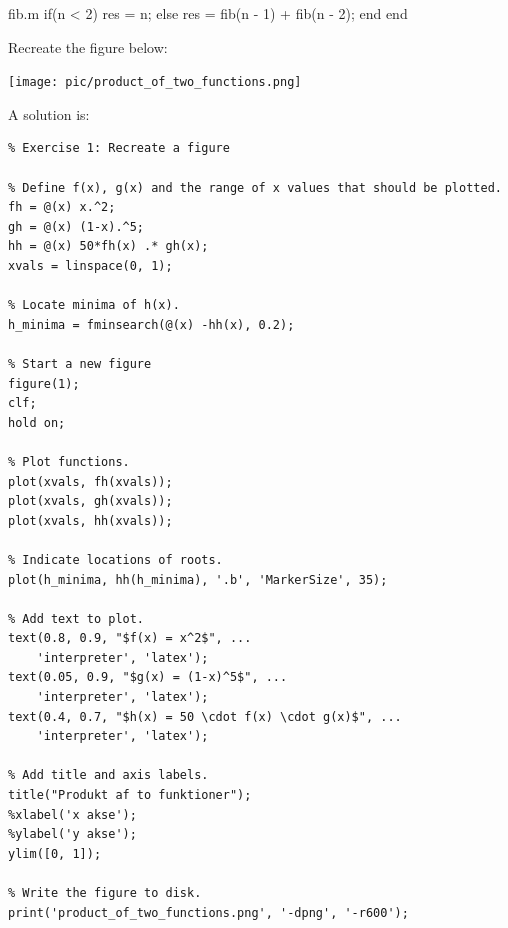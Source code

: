 \begin{ex}
\begin{solutionfile}{fib.m}
if(n < 2)
  res = n;
else
  res = fib(n - 1) + fib(n - 2);
end
end
\end{solutionfile}
\end{ex}





\begin{ex}
Recreate the figure below:
\begin{center}
\texttt{[image: pic/product\_of\_two\_functions.png]}
\end{center}
\begin{hint}
\end{hint}
\begin{sol}
A solution is:
\begin{lstlisting}
% Exercise 1: Recreate a figure

% Define f(x), g(x) and the range of x values that should be plotted.
fh = @(x) x.^2;
gh = @(x) (1-x).^5;
hh = @(x) 50*fh(x) .* gh(x);
xvals = linspace(0, 1);

% Locate minima of h(x).
h_minima = fminsearch(@(x) -hh(x), 0.2);

% Start a new figure
figure(1);
clf;
hold on;

% Plot functions.
plot(xvals, fh(xvals));
plot(xvals, gh(xvals));
plot(xvals, hh(xvals));

% Indicate locations of roots.
plot(h_minima, hh(h_minima), '.b', 'MarkerSize', 35);

% Add text to plot.
text(0.8, 0.9, "$f(x) = x^2$", ...
    'interpreter', 'latex');
text(0.05, 0.9, "$g(x) = (1-x)^5$", ...
    'interpreter', 'latex');
text(0.4, 0.7, "$h(x) = 50 \cdot f(x) \cdot g(x)$", ...
    'interpreter', 'latex');

% Add title and axis labels.
title("Produkt af to funktioner");
%xlabel('x akse');
%ylabel('y akse');
ylim([0, 1]);

% Write the figure to disk.
print('product_of_two_functions.png', '-dpng', '-r600');
\end{lstlisting}
\end{sol}
\end{ex}







